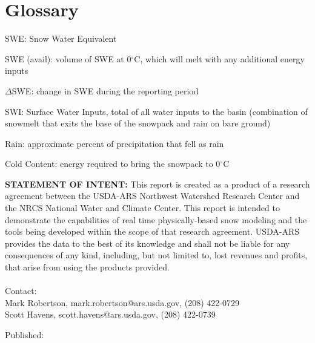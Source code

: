 \documentclass[11pt, oneside]{article}
\begin{document}
\clearpage



\clearpage



\clearpage



\clearpage
\section*{Glossary}

\begin{itemize}
	\setlength\itemsep{0.05em}
	\footnotesize{
		\item[] SWE: Snow Water Equivalent
		\item[] SWE (avail): volume of SWE at 0$^{\circ}$C, which will melt with any additional energy inputs
		\item[] $\Delta$SWE: change in SWE during the reporting period
		\item[] SWI: Surface Water Inputs, total of all water inputs to the basin (combination of snowmelt that exits the base of the snowpack and rain on bare ground)
		\item[] Rain: approximate percent of precipitation that fell as rain
		\item[] Cold Content: energy required to bring the snowpack to 0$^{\circ}$C
	}
\end{itemize}

\vspace{1cm}

\noindent\textbf{STATEMENT OF INTENT:} This report is created as a product of a research agreement between the USDA-ARS Northwest Watershed Research Center and the NRCS National Water and Climate Center. This report is intended to demonstrate the capabilities of real time physically-based snow modeling and the tools being developed within the scope of that research agreement. USDA-ARS provides the data to the best of its knowledge and shall not be liable for any consequences of any kind, including, but not limited to, lost revenues and profits, that arise from using the products provided. \\
\vspace{1cm}  \\
\noindent
Contact: \\
\hspace{2cm} Mark Robertson, mark.robertson@ars.usda.gov, (208) 422-0729 \\
\hspace{2cm} Scott Havens, scott.havens@ars.usda.gov, (208) 422-0739 \\

\par\vspace*{\fill}
\noindent
\footnotesize{
Published: 
}
\end{document}
